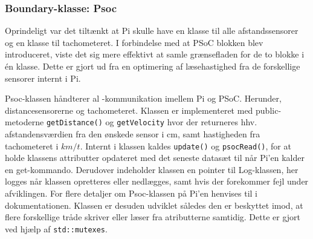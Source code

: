 \subsubsection{Boundary-klasse: Psoc} \label{sec:psoc_klasse}

Oprindeligt var det tiltænkt at Pi skulle have en klasse til alle afstandssensorer og en klasse til tachometeret.
I forbindelse med at PSoC blokken blev introduceret, viste det sig mere effektivt at samle grænsefladen for de to blokke i én klasse.
Dette er gjort ud fra en optimering af læsehastighed fra de forskellige sensorer internt i Pi.

Psoc-klassen håndterer al \IIC-kommunikation imellem Pi og PSoC. Herunder, distancesensorerne og tachometeret. 
Klassen er implementeret med public-metoderne \texttt{getDistance()} og \texttt{getVelocity} hvor der returneres hhv. afstandensværdien fra den ønskede sensor i cm, samt hastigheden fra tachometeret i $km/t$. 
Internt i klassen kaldes \texttt{update()} og \texttt{psocRead()}, for at holde klassens attributter opdateret med det seneste datasæt til når Pi'en kalder en get-kommando. 
Derudover indeholder klassen en pointer til Log-klassen, her logges når klassen opretteres eller nedlægges, samt hvis der forekommer fejl under afviklingen. For flere detaljer om Psoc-klassen på Pi'en henvises til  i dokumentationen.
Klassen er desuden udviklet således den er beskyttet imod, at flere forskellige tråde skriver eller læser fra atributterne samtidig. Dette er gjort ved hjælp af \texttt{std::mutexes}.